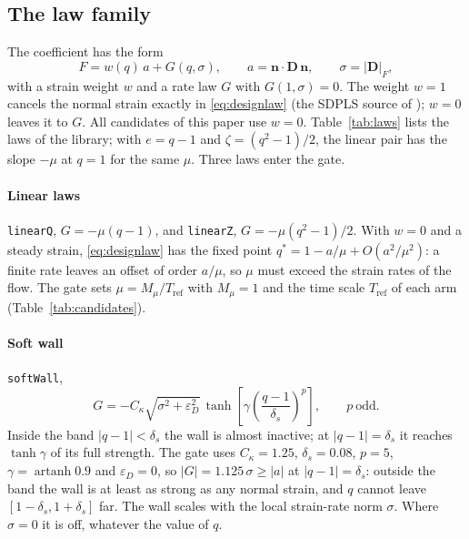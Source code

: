\documentclass[preprint,3p,11pt]{elsarticle}
\newcommand{\nhat}{\mathbf{n}}
\begin{document}
\subsection{The law family}
\label{sec:model-laws}
The coefficient has the form
\begin{equation}
  F = w(q)\,a + G(q,\sigma),\qquad
  a=\nhat\cdot\mathbf D\,\nhat,\qquad
  \sigma=|\mathbf D|_F,
  \label{eq:Fdef}
\end{equation}
with a strain weight $w$ and a rate law $G$ with $G(1,\sigma)=0$. The weight
$w=1$ cancels the normal strain exactly in \eqref{eq:designlaw} (the SDPLS source of
\cite{FrickeEtAl2022}); $w=0$ leaves it to $G$. All candidates of this paper use
$w=0$. Table~\ref{tab:laws} lists the laws of the library; with $e=q-1$ and
$\zeta=(q^2-1)/2$, the linear pair has the slope $-\mu$ at $q=1$ for the same $\mu$.
Three laws enter the gate.

\paragraph{Linear laws} \texttt{linearQ}, $G=-\mu(q-1)$, and \texttt{linearZ},
$G=-\mu(q^2-1)/2$. With $w=0$ and a steady strain, \eqref{eq:designlaw} has the fixed
point $q^\ast=1-a/\mu+O(a^2/\mu^2)$: a finite rate leaves an offset of order $a/\mu$,
so $\mu$ must exceed the strain rates of the flow. The gate sets
$\mu=M_\mu/T_\mathrm{ref}$ with $M_\mu=1$ and the time scale $T_\mathrm{ref}$ of each
arm (Table~\ref{tab:candidates}).

\paragraph{Soft wall} \texttt{softWall},
\begin{equation}
  G=-C_\kappa\sqrt{\sigma^2+\varepsilon_D^2}\,
     \tanh\!\left[\gamma\left(\frac{q-1}{\delta_s}\right)^{p}\right],
  \qquad p\ \text{odd}.
  \label{eq:softwall}
\end{equation}
Inside the band $|q-1|<\delta_s$ the wall is almost inactive; at $|q-1|=\delta_s$ it
reaches $\tanh\gamma$ of its full strength. The gate uses $C_\kappa=1.25$,
$\delta_s=0.08$, $p=5$, $\gamma=\operatorname{artanh}0.9$ and $\varepsilon_D=0$, so
$|G|=1.125\,\sigma\ge|a|$ at $|q-1|=\delta_s$: outside the band the wall is at least as
strong as any normal strain, and $q$ cannot leave $[1-\delta_s,1+\delta_s]$ far. The
wall scales with the local strain-rate norm $\sigma$. Where $\sigma=0$ it is off,
whatever the value of $q$.
\end{document}
